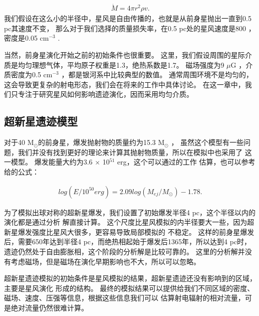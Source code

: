 \begin{equation}
  \begin{aligned}
    \dot{M}=4\pi r^2\rho v.
  \end{aligned}
\end{equation}
我们假设在这么小的半径中，星风是自由传播的，也就是从前身星抛出一直到0.5 pc其速度不变，
那么对于我们选择的质量损失率，在0.5 pc处的星风速度是800 \kms，密度是0.05 cm$^{-3}$
\citep{Meyer2014}.

当然，前身星演化开始之前的初始条件也很重要。
这里，我们假设周围的星际介质是均匀理想气体，平均原子权重是1.3，绝热系数是1.7。
磁场强度为9 $\mu$G \citep{Haverkorn2015}，介质密度为0.5 cm$^{-3}$
\citep{Nakanishi2006,Nakanishi2016}，都是银河系中比较典型的数值。
通常周围环境不是均匀的，这会导致更复杂的射电形态，我们会在将来的工作中具体讨论。
在这一章中，我们只专注于研究星风如何影响遗迹演化，因而采用均匀介质。

\subsection{超新星遗迹模型}
对于40 M$_{\odot}$的前身星，爆发抛射物的质量约为15.3 M$_{\odot}$ \citep{Sukhbold2016}，
虽然这个模型有一些问题，我们并没有找到更好的理论来计算其抛射物质量，所以在模拟中也采用了
这一模型。
爆发能量大约为3.6 $\times$ 10$^{51}$ erg，这个可以通过\citet{Poznanski2013}的工作
估算，也可以参考\citet{Mueller2016a}给的公式：

\begin{equation}
  \begin{aligned}
    log(E/10^{50}erg)=2.09log(M_{ej}/M_{\odot})-1.78.
  \end{aligned}
\end{equation}

为了模拟出球对称的超新星爆发，我们设置了初始爆发半径4 pc，这个半径以内的演化都是通过分析
解直接计算。
这个尺度比星风模拟的内半径要大一些，因为超新星爆发强度比星风大很多，更容易导致局部模拟的
不稳定。
这样的前身星爆发后，需要650年达到半径4 pc，而绝热相起始于爆发后1365年，所以达到4 pc时，
遗迹仍然处于自由膨胀相，这个阶段的分析解是比较可靠的\citep{Leahy2017a,Truelove1999}。
这里的分析解并没有考虑磁场，但是磁场在演化早期影响也不大，所以可以忽略。

超新星遗迹模拟的初始条件是星风模拟的结果，超新星遗迹还没有影响到的区域，主要是星风演化
形成的结构。
最终的模拟结果可以提供给我们不同区域的密度、磁场、速度、压强等信息，根据这些信息我们可以
估算射电辐射的相对流量，可是绝对流量仍然很难计算。

